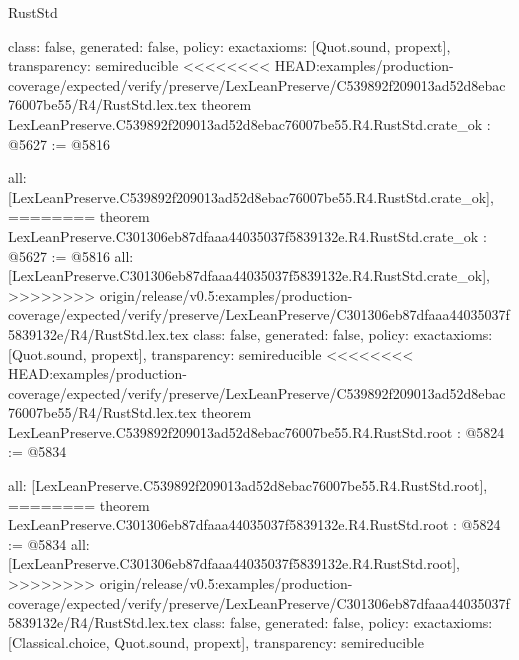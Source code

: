 \begin{lexlean}{RustStd}
\begin{coremodule}
{\begin{coremodule}
{{{{{{{{{{  class: false,
  generated: false,
  policy: exact{axioms: [Quot.sound, propext]},
  transparency: semireducible
}
<<<<<<<< HEAD:examples/production-coverage/expected/verify/preserve/LexLeanPreserve/C539892f209013ad52d8ebac76007be55/R4/RustStd.lex.tex
theorem LexLeanPreserve.C539892f209013ad52d8ebac76007be55.R4.RustStd.crate_ok : @5627 := @5816 {
  all: [LexLeanPreserve.C539892f209013ad52d8ebac76007be55.R4.RustStd.crate_ok],
========
theorem LexLeanPreserve.C301306eb87dfaaa44035037f5839132e.R4.RustStd.crate_ok : @5627 := @5816 {
  all: [LexLeanPreserve.C301306eb87dfaaa44035037f5839132e.R4.RustStd.crate_ok],
>>>>>>>> origin/release/v0.5:examples/production-coverage/expected/verify/preserve/LexLeanPreserve/C301306eb87dfaaa44035037f5839132e/R4/RustStd.lex.tex
  class: false,
  generated: false,
  policy: exact{axioms: [Quot.sound, propext]},
  transparency: semireducible
}
<<<<<<<< HEAD:examples/production-coverage/expected/verify/preserve/LexLeanPreserve/C539892f209013ad52d8ebac76007be55/R4/RustStd.lex.tex
theorem LexLeanPreserve.C539892f209013ad52d8ebac76007be55.R4.RustStd.root : @5824 := @5834 {
  all: [LexLeanPreserve.C539892f209013ad52d8ebac76007be55.R4.RustStd.root],
========
theorem LexLeanPreserve.C301306eb87dfaaa44035037f5839132e.R4.RustStd.root : @5824 := @5834 {
  all: [LexLeanPreserve.C301306eb87dfaaa44035037f5839132e.R4.RustStd.root],
>>>>>>>> origin/release/v0.5:examples/production-coverage/expected/verify/preserve/LexLeanPreserve/C301306eb87dfaaa44035037f5839132e/R4/RustStd.lex.tex
  class: false,
  generated: false,
  policy: exact{axioms: [Classical.choice, Quot.sound, propext]},
  transparency: semireducible
}

}}}}}}}}}}}
\end{coremodule}}
\end{coremodule}
\end{lexlean}
